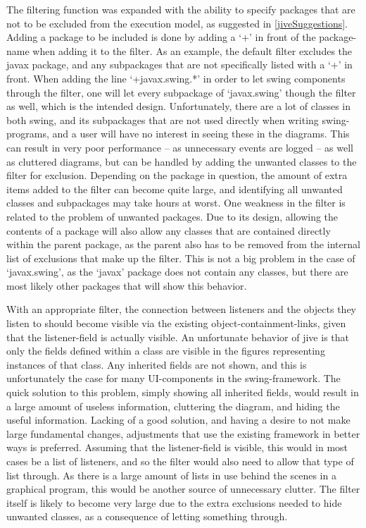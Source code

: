 The filtering function was expanded with the ability to specify packages that are not to be excluded from the execution model, as suggested in \cref{jiveSuggestions}.
Adding a package to be included is done by adding a `+' in front of the package-name when adding it to the filter.
As an example, the default filter excludes the javax package, and any subpackages that are not specifically listed with a `+' in front.
When adding the line `+javax.swing.*' in order to let swing components through the filter, one will let every subpackage of `javax.swing' though the filter as well, which is the intended design.
Unfortunately, there are a lot of classes in both swing, and its subpackages that are not used directly when writing swing-programs, and a user will have no interest in seeing these in the diagrams.
This can result in very poor performance -- as unnecessary events are logged -- as well as cluttered diagrams, but can be handled by adding the unwanted classes to the filter for exclusion.
Depending on the package in question, the amount of extra items added to the filter can become quite large, and identifying all unwanted classes and subpackages may take hours at worst.
One weakness in the filter is related to the problem of unwanted packages.
Due to its design, allowing the contents of a package will also allow any classes that are contained directly within the parent package, as the parent also has to be removed from the internal list of exclusions that make up the filter.
This is not a big problem in the case of `javax.swing', as the `javax' package does not contain any classes, but there are most likely other packages that will show this behavior.

With an appropriate filter, the connection between listeners and the objects they listen to should become visible via the existing object-containment-links, given that the listener-field is actually visible.
An unfortunate behavior of \gls{jive} is that only the fields defined within a class are visible in the figures representing instances of that class.
Any inherited fields are not shown, and this is unfortunately the case for many UI-components in the swing-framework.
The quick solution to this problem, simply showing all inherited fields, would result in a large amount of useless information, cluttering the diagram, and hiding the useful information.
Lacking of a good solution, and having a desire to not make large fundamental changes, adjustments that use the existing framework in better ways is preferred.
Assuming that the listener-field is visible, this would in most cases be a list of listeners, and so the filter would also need to allow that type of list through.
As there is a large amount of lists in use behind the scenes in a graphical program, this would be another source of unnecessary clutter.
The filter itself is likely to become very large due to the extra exclusions needed to hide unwanted classes, as a consequence of letting something through.

